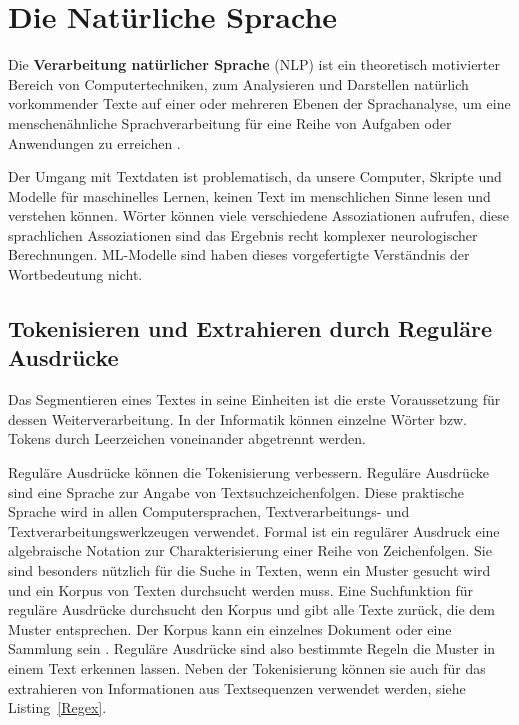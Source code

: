 \chapter{Die Natürliche Sprache}


Die \textbf{Verarbeitung natürlicher Sprache} (NLP) ist ein theoretisch motivierter Bereich von Computertechniken, zum Analysieren und Darstellen natürlich vorkommender Texte auf einer oder mehreren Ebenen der Sprachanalyse, um eine menschenähnliche Sprachverarbeitung für eine Reihe von Aufgaben oder Anwendungen zu erreichen \cite*{Liddy}.

Der Umgang mit Textdaten ist problematisch, da unsere Computer, Skripte und Modelle für maschinelles Lernen, keinen Text im menschlichen Sinne lesen und verstehen können. Wörter können viele verschiedene Assoziationen aufrufen, diese sprachlichen Assoziationen sind das Ergebnis recht komplexer neurologischer Berechnungen. ML-Modelle sind haben dieses vorgefertigte Verständnis der Wortbedeutung nicht.



\section{Tokenisieren und Extrahieren durch Reguläre Ausdrücke}
Das Segmentieren eines Textes in seine Einheiten ist die erste Voraussetzung für dessen Weiterverarbeitung. In der Informatik können einzelne Wörter bzw. Tokens durch Leerzeichen voneinander abgetrennt werden.

Reguläre Ausdrücke können die Tokenisierung verbessern. Reguläre Ausdrücke sind eine Sprache zur Angabe von Textsuchzeichenfolgen. Diese praktische Sprache wird in allen Computersprachen, Textverarbeitungs- und Textverarbeitungswerkzeugen verwendet. Formal ist ein regulärer Ausdruck eine algebraische Notation zur Charakterisierung einer Reihe von Zeichenfolgen. Sie sind besonders nützlich für die Suche in Texten, wenn ein Muster gesucht wird und ein Korpus von Texten durchsucht werden muss. Eine Suchfunktion für reguläre Ausdrücke durchsucht den Korpus und gibt alle Texte zurück, die dem Muster entsprechen. Der Korpus kann ein einzelnes Dokument oder eine Sammlung sein \cite*[3]{Jurafskya}. Reguläre Ausdrücke sind also bestimmte Regeln die Muster in einem Text erkennen lassen. Neben der Tokenisierung können sie auch für das extrahieren von Informationen aus Textsequenzen verwendet werden, siehe Listing~\ref{Regex}.


